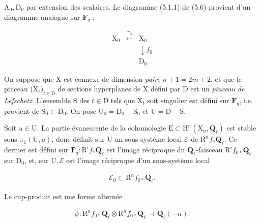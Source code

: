 \documentclass[10pt,leqno]{article}
\begin{document}
\clearpage

\label{physical-24}\setcounter{page}{295}

\noindent \(\mathrm{A}_{0}, \mathrm{D}_{0}\) par extension des scalaires. Le diagramme (5.1.1) de (5.6) provient d’un diagramme analogue sur \(\mathbf{F}_{q}\) :\par

\[\begin{array}{ccc}\mathrm X_0&\xleftarrow{\pi_0}&\widetilde{\mathrm X}_0\\ &&\downarrow\!{f_0}\\ &&\mathrm D_0\end{array}\tag{6.1.1}\]

\noindent On suppose que \(\mathrm{X}\) est connexe de dimension \emph{paire} \(n+1=2m+2\), et que le pinceau (\(\mathrm{X}_{t})_{t\in \mathrm{D}}\) de sections hyperplanes de \(\mathrm{X}\) défini par \(\mathrm{D}\) est un \emph{pinceau de Lefschetz}. L’ensemble \(\mathrm{S}\) des \(t\in \mathrm{D}\) tels que \(\mathrm{X}_{t}\) soit singulier est défini sur \(\mathbf{F}_{q}\), i.e. provient de \(\mathrm{S}_{0}\subset \mathrm{D}_{0}\). On pose \(\mathrm{U}_{0}=\mathrm{D}_{0}- \mathrm{S}_{0}\) et \(\mathrm{U}=\mathrm{D}- \mathrm{S}\).\par

\noindent Soit \(u\in \mathrm{U}\). La partie évanescente de la cohomologie \(\mathrm{E}\subset \mathrm{H}^{n}(\mathrm{X}_{u},\mathbf{Q}_{\ell })\) est stable sous \(\pi _{1}(\mathrm{U},u)\), donc définit sur \(\mathrm{U}\) un sous-système local \(\mathcal{E} \) de \(\mathrm{R}^{n} f_{*}\mathbf{Q}_{\ell }\). Ce dernier est défini sur \(\mathbf{F}_{q} : \mathrm{R}^{i} f_{*}\mathbf{Q}_{\ell }\) est l’image réciproque du \(\mathbf{Q}_{\ell }\)-faisceau \(\mathrm{R}^{i} f_{0*}\mathbf{Q}_{\ell }\) sur \(\mathrm{D}_{0}\), et, sur \(\mathrm{U}, \mathcal{E} \) est l’image réciproque d’un sous-système local\par

\begin{equation*}\begin{gathered}\mathcal{E} _{0} \subset  \mathrm{R}^{n} f_{0*}\mathbf{Q}_{\ell }.\end{gathered}\end{equation*}

\noindent Le cup-produit est une forme alternée\par

\begin{equation*}\begin{gathered}\psi  : \mathrm{R}^{n} f_{0*}\mathbf{Q}_{\ell }\otimes \mathrm{R}^{n} f_{0*}\mathbf{Q}_{\ell } \longrightarrow  \mathbf{Q}_{\ell }(- n).\end{gathered}\end{equation*}
\end{document}
